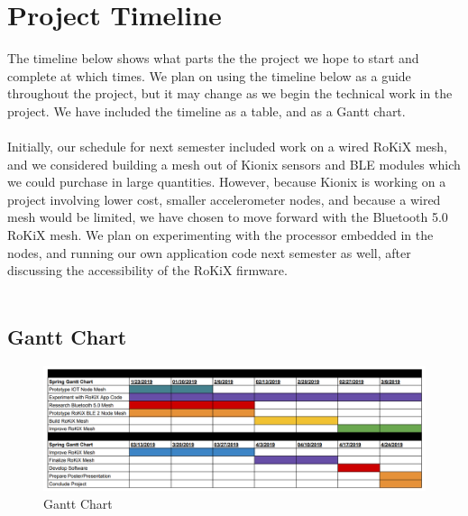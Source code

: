 \documentclass[11pt, a4paper]{article}
\begin{document}
\section{Project Timeline}

The timeline below shows what parts the the project we hope to start and complete at which times. We plan on using the timeline below as a guide throughout the project, but it may change as we begin the technical work in the project. We have included the timeline as a table, and as a Gantt chart. \\
\\
Initially, our schedule for next semester included work on a wired RoKiX mesh, and we considered building a mesh out of Kionix sensors and BLE modules which we could purchase in large quantities. However, because Kionix is working on a project involving lower cost, smaller accelerometer nodes, and because a wired mesh would be limited, we have chosen to move forward with the Bluetooth 5.0 RoKiX mesh. We plan on experimenting with the processor embedded in the nodes, and running our own application code next semester as well, after discussing the accessibility of the RoKiX firmware. 
\\
\\


\subsection{Gantt Chart}
 

 	\begin{figure}[!htbp]

 \begin{adjustwidth}{-1.5cm}{}
\begin{center}
\includegraphics[scale=0.33]{Images/gantt.png}
\end{center}
 \end{adjustwidth}
\caption{Gantt Chart}
 	\end{figure}


\end{document}
